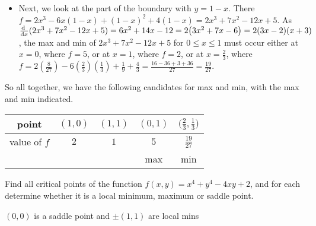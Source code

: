 \begin{solution}
\begin{itemize}
\item
Next, we look at the part of the boundary with $y=1-x$. There $f=2x^3-6x(1-x)
+(1-x)^2+4(1-x)=2x^3+7x^2-12x+5$.
As $\diff{}{x}(2x^3+7x^2-12x+5)=6x^2+14x-12
                               =2\big(3x^2+7x-6\big)
                               =2(3x-2)(x+3)$, 
the max and min of $2x^3+7x^2-12x+5$ for $0\le x\le 1$ must occur either at $x=0$, 
where $f=5$, or at $x=1$, where $f=2$, or at $x=\frac{2}{3}$, where $f=2(\frac{8}{27})-6(\frac{2}{3})(\frac{1}{3})+\frac{1}{9}+\frac{4}{3}
=\frac{16-36+3+36}{27}
=\frac{19}{27}$.
\end{itemize}
So all together, we have the following candidates for max and min, with the
max and min indicated.
\begin{center}
\renewcommand{\arraystretch}{1.3}
     \begin{tabular}{|c|c|c|c|c|}
     \hline
       point
       &$(1,0)$
       &$(1,1)$ 
       &$(0,1)$ 
       &$\big(\frac{2}{3},\frac{1}{3}\big)$ \\ \hline
       value of $f$
       &$2$
       &$1$
       &$5$
       &$\frac{19}{27}$\\ \hline
       & 
       & 
       & max
       & min\\ \hline
     \end{tabular}
\renewcommand{\arraystretch}{1.0}
\end{center}
\end{solution}

\begin{question}[M200 2003D] %
Find all critical points of the function $f(x,y)=x^4+y^4-4xy+2$, 
and for each determine whether it is a local minimum, maximum
or saddle point.
\end{question}

%

\begin{answer}
$(0,0)$ is a saddle point and $\pm(1,1)$ are local mins
\end{answer}

